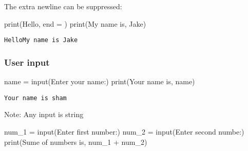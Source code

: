 \documentclass[
  letterpaper,
  DIV=11,
  numbers=noendperiod]{scrreprt}
\newenvironment{Shaded}{\begin{snugshade}}{\end{snugshade}}
\newcommand{\BuiltInTok}[1]{\textcolor[rgb]{0.00,0.46,0.62}{#1}}
\newcommand{\NormalTok}[1]{\textcolor[rgb]{0.00,0.46,0.62}{#1}}
\newcommand{\OperatorTok}[1]{\textcolor[rgb]{0.37,0.37,0.37}{#1}}
\newcommand{\StringTok}[1]{\textcolor[rgb]{0.13,0.47,0.30}{#1}}
\begin{document}
The extra newline can be suppressed:

\begin{Shaded}
\begin{Highlighting}[]
\BuiltInTok{print}\NormalTok{(}\StringTok{\textquotesingle{}Hello\textquotesingle{}}\NormalTok{, end }\OperatorTok{=} \StringTok{\textquotesingle{}\textquotesingle{}}\NormalTok{)}
\BuiltInTok{print}\NormalTok{(}\StringTok{\textquotesingle{}My name is\textquotesingle{}}\NormalTok{, }\StringTok{\textquotesingle{}Jake\textquotesingle{}}\NormalTok{)}
\end{Highlighting}
\end{Shaded}

\begin{verbatim}
HelloMy name is Jake
\end{verbatim}

\hypertarget{user-input}{%
\subsubsection{User input}\label{user-input}}

\begin{Shaded}
\begin{Highlighting}[]
\NormalTok{name }\OperatorTok{=} \BuiltInTok{input}\NormalTok{(}\StringTok{\textquotesingle{}Enter your name:\textquotesingle{}}\NormalTok{)}
\BuiltInTok{print}\NormalTok{(}\StringTok{\textquotesingle{}Your name is\textquotesingle{}}\NormalTok{, name)}
\end{Highlighting}
\end{Shaded}

\begin{verbatim}
Your name is sham
\end{verbatim}

Note: Any input is string

\begin{Shaded}
\begin{Highlighting}[]
\NormalTok{num\_1 }\OperatorTok{=} \BuiltInTok{input}\NormalTok{(}\StringTok{\textquotesingle{}Enter first number:\textquotesingle{}}\NormalTok{)}
\NormalTok{num\_2 }\OperatorTok{=} \BuiltInTok{input}\NormalTok{(}\StringTok{\textquotesingle{}Enter second numbe:\textquotesingle{}}\NormalTok{)}
\BuiltInTok{print}\NormalTok{(}\StringTok{\textquotesingle{}Sume of numbers is\textquotesingle{}}\NormalTok{, num\_1 }\OperatorTok{+}\NormalTok{ num\_2)}
\end{Highlighting}
\end{Shaded}
\end{document}
